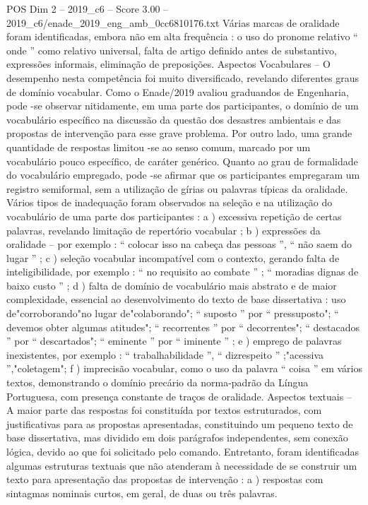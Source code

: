 \begin{textsample}{POS Dim 2 – 2019\_c6 – Score 3.00 – 2019\_c6/enade\_2019\_eng\_amb\_0cc6810176.txt}
Várias marcas de oralidade foram identificadas, embora não em alta frequência : o uso do pronome relativo “ onde ” como relativo universal, falta de artigo definido antes de substantivo, expressões informais, eliminação de preposições.
Aspectos Vocabulares – O desempenho nesta competência foi muito diversificado, revelando diferentes graus de domínio vocabular.
Como o Enade/2019 avaliou graduandos de Engenharia, pode -se observar nitidamente, em uma parte dos participantes, o domínio de um vocabulário específico na discussão da questão dos desastres ambientais e das propostas de intervenção para esse grave problema.
Por outro lado, uma grande quantidade de respostas limitou -se ao senso comum, marcado por um vocabulário pouco específico, de caráter genérico.
Quanto ao grau de formalidade do vocabulário empregado, pode -se afirmar que os participantes empregaram um registro semiformal, sem a utilização de gírias ou palavras típicas da oralidade.
Vários tipos de inadequação foram observados na seleção e na utilização do vocabulário de uma parte dos participantes : a ) excessiva repetição de certas palavras, revelando limitação de repertório vocabular ; b ) expressões da oralidade – por exemplo : “ colocar isso na cabeça das pessoas ”, “ não saem do lugar ” ; c ) seleção vocabular incompatível com o contexto, gerando falta de inteligibilidade, por exemplo : “ no requisito ao combate ” ; “ moradias dignas de baixo custo ” ; d ) falta de domínio de vocabulário mais abstrato e de maior complexidade, essencial ao desenvolvimento do texto de base dissertativa : uso de"corroborando"no lugar de"colaborando"; “ suposto ” por “ pressuposto"; “ devemos obter algumas atitudes"; “ recorrentes ” por “ decorrentes"; “ destacados ” por “ descartados"; “ eminente ” por “ iminente ” ; e ) emprego de palavras inexistentes, por exemplo : “ trabalhabilidade ”, “ dizrespeito ” ;"acessiva ”,"coletagem"; f ) imprecisão vocabular, como o uso da palavra “ coisa ” em vários textos, demonstrando o domínio precário da norma-padrão da Língua Portuguesa, com presença constante de traços de oralidade.
Aspectos textuais – A maior parte das respostas foi constituída por textos estruturados, com justificativas para as propostas apresentadas, constituindo um pequeno texto de base dissertativa, mas dividido em dois parágrafos independentes, sem conexão lógica, devido ao que foi solicitado pelo comando.
Entretanto, foram identificadas algumas estruturas textuais que não atenderam à necessidade de se construir um texto para apresentação das propostas de intervenção : a ) respostas com sintagmas nominais curtos, em geral, de duas ou três palavras.

\end{textsample}
